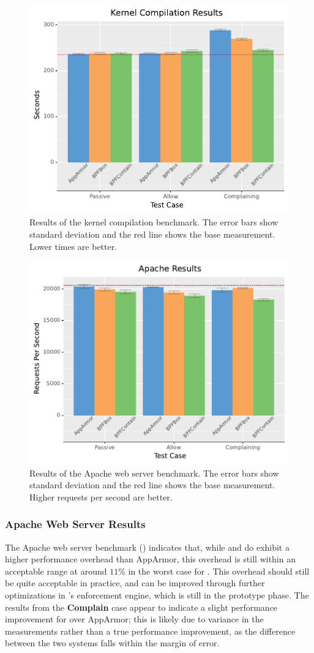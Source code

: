 \begin{figure}[p]
  \centering
  \includegraphics[width=0.6\linewidth]{results/graphs/Kernel-Compilation.pdf}
  \caption{
    Results of the kernel compilation benchmark.
    The error bars show standard deviation and the red line shows the base measurement.
    Lower times are better.
  }%
  \label{fig:phoronix-kernel}
\end{figure}

\begin{figure}[p]
  \centering
  \includegraphics[width=0.6\linewidth]{results/graphs/Apache.pdf}
  \caption{
    Results of the Apache web server benchmark.
    The error bars show standard deviation and the red line shows the base measurement.
    Higher requests per second are better.
  }%
  \label{fig:phoronix-apache}
\end{figure}


\subsubsection{Apache Web Server Results}

The Apache web server benchmark () indicates that, while
\bpfbox{} and \bpfcontain{} do exhibit a higher performance overhead than AppArmor, this
overhead is still within an acceptable range at around $11\%$ in the worst case for
\bpfcontain{}. This overhead should still be quite acceptable in practice, and can be
improved through further optimizations in \bpfcontain{}'s enforcement engine, which is
still in the prototype phase. The results from the \textbf{Complain} case appear to
indicate a slight performance improvement for \bpfbox{} over AppArmor; this is likely due
to variance in the measurements rather than a true performance improvement, as the
difference between the two systems falls within the margin of error.

